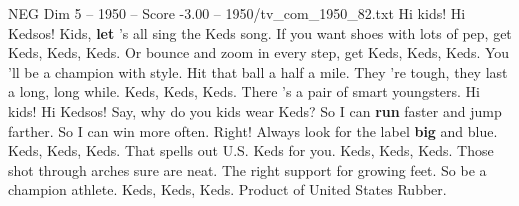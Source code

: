 \begin{textsample}{NEG Dim 5 – 1950 – Score -3.00 – 1950/tv\_com\_1950\_82.txt}  \label{ex:f5_neg_050}
Hi kids!
Hi Kedsos!
Kids, \textbf{let} 's all sing the Keds song.
If you want shoes with lots of pep, get Keds, Keds, Keds.
Or bounce and zoom in every step, get Keds, Keds, Keds.
You 'll be a champion with style.
Hit that ball a half a mile.
They 're tough, they last a long, long while.
Keds, Keds, Keds.
There 's a pair of smart youngsters.
Hi kids!
Hi Kedsos!
Say, why do you kids wear Keds?
So I can \textbf{run} faster and jump farther.
So I can win more often.
Right!
Always look for the label \textbf{big} and blue.
Keds, Keds, Keds.
That spells out U.S.
Keds for you.
Keds, Keds, Keds.
Those shot through arches sure are neat.
The right support for growing feet.
So be a champion athlete.
Keds, Keds, Keds.
Product of United States Rubber.

\end{textsample}
